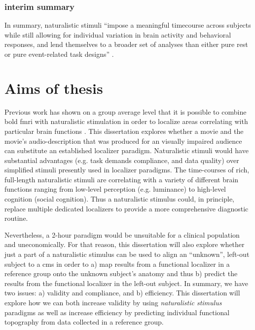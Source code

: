 

\subsubsection{interim summary}
In summary, naturalistic stimuli ``impose a meaningful timecourse across
subjects while still allowing for individual variation in brain activity and
behavioral responses, and lend themselves to a broader set of analyses than
either pure rest or pure event-related task designs'' \citep{finn2017can}.


\section{Aims of thesis}


%
Previous work has shown on a group average level that it is possible to combine
\ac{bold} \ac{fmri} with naturalistic stimulation in order to localize areas
correlating with particular brain functions \citep{bartels2004mapping}.
%
This dissertation explores whether a movie and the movie's audio-description
that was produced for an visually impaired audience can substitute an
established localizer paradigm.
%
Naturalistic stimuli would have substantial advantages (e.g. task demands
compliance, and data quality) over simplified stimuli presently used in
localizer paradigms.
%
The time-courses of rich, full-length naturalistic stimuli are correlating with
a variety of different brain functions ranging from low-level perception (e.g.
luminance) to high-level cognition (social cognition).
%
Thus a naturalistic stimulus could, in principle, replace multiple dedicated
localizers to provide a more comprehensive diagnostic routine.

%
Nevertheless, a 2-hour paradigm would be unsuitable for a clinical population
and uneconomically.
%
For that reason, this dissertation will also explore whether just a part of a
naturalistic stimulus can be used to align an ``unknown'', left-out subject to a
\ac{cms} in order to a) map results from a functional localizer in a reference
group onto the unknown subject's anatomy and thus b) predict the results from
the functional localizer in the left-out subject.
%
In summary, we have two issues: a) validity and compliance, and b) efficiency.
This dissertation will explore how we can both increase validity by using
\textit{naturalistic stimulus} paradigms as well as increase efficiency by
predicting individual functional topography from data collected in a reference
group.



